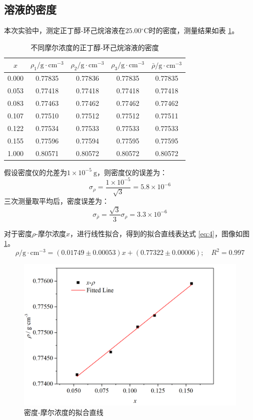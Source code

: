 \documentclass[cn,hazy,pku,12pt,normal,math=newtx,cite=super]{elegantnote}
\begin{document}
\subsection{溶液的密度}

本次实验中，测定正丁醇-环己烷溶液在$25.00\mathrm{{}^\circ C}$时的密度，测量结果如表 \ref{tab:3}。

\begin{table}[htbp]
    \centering
    \caption{不同摩尔浓度的正丁醇-环己烷溶液的密度}
    \begin{tabular}{ccccc}
    \toprule
        $x$ & $\rho_1/\mathrm{g\cdot cm^{-3}}$ & $\rho_2/\mathrm{g\cdot cm^{-3}}$ & $\rho_3/\mathrm{g\cdot cm^{-3}}$ & $\bar{\rho}/\mathrm{g\cdot cm^{-3}}$ \\
    \midrule
    0.000 & 0.77835 & 0.77836 & 0.77835 & 0.77835 \\
    0.053 & 0.77418 & 0.77418 & 0.77418 & 0.77418 \\
    0.083 & 0.77463 & 0.77462 & 0.77462 & 0.77462 \\
    0.107 & 0.77510 & 0.77512 & 0.77512 & 0.77511 \\
    0.122 & 0.77534 & 0.77533 & 0.77533 & 0.77533 \\
    0.155 & 0.77596 & 0.77594 & 0.77595 & 0.77595 \\
    1.000 & 0.80571 & 0.80572 & 0.80572 & 0.80572 \\
    \bottomrule
    \end{tabular}
    \label{tab:3}
\end{table}

假设密度仪的允差为$1\times 10^{-5}\mathrm{~g}$，则密度仪的误差为：
\begin{equation*}
    \sigma_{\rho} = \frac{1\times 10^{-5}}{\sqrt{3}} = 5.8 \times 10^{-6}
\end{equation*}
三次测量取平均后，密度误差为：
\begin{equation*}
    \sigma_{\bar{\rho}} = \frac{\sqrt{3}}{3}\sigma_{\rho} = 3.3 \times 10^{-6}
\end{equation*}

对于密度$\rho$-摩尔浓度$x$，进行线性拟合，得到的拟合直线表达式 \eqref{eq:4}，图像如图 \ref{fig:3}。
\begin{equation}\label{eq:4}
    \rho/\mathrm{g\cdot cm^{-3}} = (0.01749 \pm 0.00053) x + (0.77322 \pm 0.00006);\quad R^2 = 0.997
\end{equation}

\begin{figure}[htbp]
    \centering
    \includegraphics[width=.7\textwidth]{figures/1-2.png}
    \caption{密度-摩尔浓度的拟合直线}
    \label{fig:3}
\end{figure}
\end{document}

